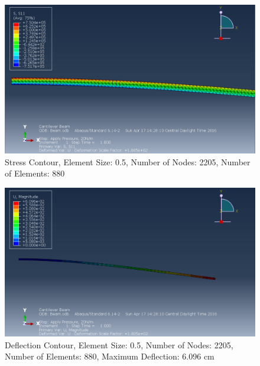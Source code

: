 \documentclass[a4paper]{article}
\begin{document}
\begin{figure}[ht]
\centering
\includegraphics[scale=.5]{6Nsize0_5Stress.PNG}
\caption{Stress Contour, Element Size: 0.5, Number of Nodes: 2205, Number of Elements: 880}
\end{figure}
\begin{figure}[ht]
\centering
\includegraphics[scale=.5]{6Nsize0_5MDisplacement.PNG}
\caption{Deflection Contour, Element Size: 0.5, Number of Nodes: 2205, Number of Elements: 880, Maximum Deflection: 6.096 cm}
\end{figure}
\end{document}
